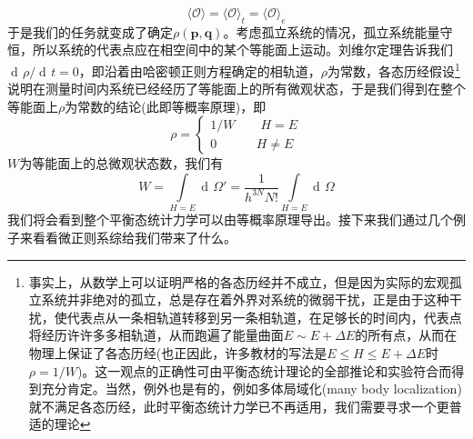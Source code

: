 \documentclass[UTF8,oneside,openany]{ctexbook}
\DeclareMathOperator\dif{d\!}
\newcommand\aver[1]{\langle#1\rangle}
\begin{document}
\begin{equation}
\aver{\mathcal{O}}=\aver{\mathcal{O}}_t=\aver{\mathcal{O}}_e
\end{equation}
于是我们的任务就变成了确定$\rho(\pmb{p},\pmb{q})$。考虑孤立系统的情况，孤立系统能量守恒，所以系统的代表点应在相空间中的某个等能面上运动。刘维尔定理告诉我们$\dif\rho/\dif t=0$，即沿着由哈密顿正则方程确定的相轨道，$\rho$为常数，各态历经假设\footnote{事实上，从数学上可以证明严格的各态历经并不成立，但是因为实际的宏观孤立系统并非绝对的孤立，总是存在着外界对系统的微弱干扰，正是由于这种干扰，使代表点从一条相轨道转移到另一条相轨道，在足够长的时间内，代表点将经历许许多多相轨道，从而跑遍了能量曲面$E\sim E+\Delta E$的所有点，从而在物理上保证了各态历经(也正因此，许多教材的写法是$E\le H\le E+\Delta E$时$\rho=1/W$)。这一观点的正确性可由平衡态统计理论的全部推论和实验符合而得到充分肯定。当然，例外也是有的，例如多体局域化(many body localization)就不满足各态历经，此时平衡态统计力学已不再适用，我们需要寻求一个更普适的理论}说明在测量时间内系统已经经历了等能面上的所有微观状态，于是我们得到在整个等能面上$\rho$为常数的结论(此即等概率原理)，即
\begin{equation}
\rho=\begin{cases}{}
1/W\qquad H=E\\
0\qquad\ \ \ \ \  H\neq E
\end{cases}
\end{equation}
$W$为等能面上的总微观状态数，我们有
\begin{equation}
W=\int\limits_{H=E}\dif\Omega'=\frac{1}{h^{3N}N!}\int\limits_{H=E}\dif\Omega
\end{equation}
我们将会看到整个平衡态统计力学可以由等概率原理导出。接下来我们通过几个例子来看看微正则系综给我们带来了什么。
\end{document}

